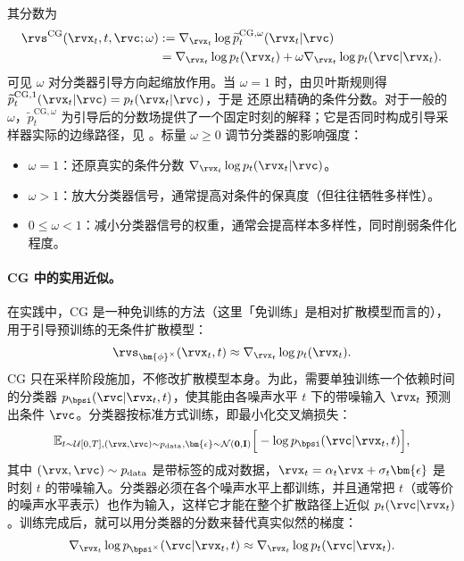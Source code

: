 其分数为
\begin{align}
\rvs^{\mathrm{CG}}(\rvx_t,t,\rvc;\omega)
&:=
\nabla_{\rvx_t}
\log\widetilde p_t^{\mathrm{CG},\omega}(\rvx_t|\rvc)
\nonumber\\
&=
\nabla_{\rvx_t}\log p_t(\rvx_t)
+
\omega\nabla_{\rvx_t}\log p_t(\rvc|\rvx_t).
\label{eq:cg_omega}
\end{align}
可见 $\omega$ 对分类器引导方向起缩放作用。当 $\omega=1$ 时，由贝叶斯规则得
$\widetilde p_t^{\mathrm{CG},1}(\rvx_t|\rvc)=p_t(\rvx_t|\rvc)$，于是
 还原出精确的条件分数。对于一般的
$\omega$，$\widetilde p_t^{\mathrm{CG},\omega}$ 为引导后的分数场提供了一个固定时刻的解释；它是否同时构成引导采样器实际的边缘路径，见
。标量 $\omega \ge 0$ 调节分类器的影响强度：
\begin{itemize}
    \item $\omega = 1$：还原真实的条件分数 $\nabla_{\rvx_t} \log p_t(\rvx_t |\rvc)$。
    \item $\omega > 1$：放大分类器信号，通常提高对条件的保真度（但往往牺牲多样性）。
    \item $0 \le \omega < 1$：减小分类器信号的权重，通常会提高样本多样性，同时削弱条件化程度。
\end{itemize}

\paragraph{CG 中的实用近似。}
在实践中，CG 是一种免训练的方法（这里「免训练」是相对扩散模型而言的），用于引导预训练的无条件扩散模型：
\[
\rvs_{\bm{\phi}^\times}(\rvx_t ,t) \approx \nabla_{\rvx_t} \log p_t(\rvx_t).
\]
CG 只在采样阶段施加，不修改扩散模型本身。为此，需要单独训练一个依赖时间的分类器 $p_{\bpsi}(\rvc |\rvx_t,t)$，使其能由各噪声水平 $t$ 下的带噪输入 $\rvx_t$ 预测出条件 $\rvc$。分类器按标准方式训练，即最小化交叉熵损失：
\begin{align}
\mathbb{E}_{t \sim \mathcal{U}[0,T], (\rvx, \rvc) \sim p_{\text{data}},  \bm{\epsilon} \sim \mathcal{N}(\mathbf{0}, \mathbf{I})}
\Big[ -\log p_{\bpsi}(\rvc | \rvx_t,t) \Big],
\end{align}
其中 $(\rvx,\rvc)\sim p_{\text{data}}$ 是带标签的成对数据，$\rvx_t = \alpha_t \rvx + \sigma_t \bm{\epsilon}$ 是时刻 $t$ 的带噪输入。分类器必须在各个噪声水平上都训练，并且通常把 $t$（或等价的噪声水平表示）也作为输入，这样它才能在整个扩散路径上近似
$p_t(\rvc|\rvx_t)$。训练完成后，就可以用分类器的分数来替代真实似然的梯度：
\[
\nabla_{\rvx_t} \log p_{\bpsi^\times}(\rvc |\rvx_t,t) \approx \nabla_{\rvx_t} \log p_t(\rvc |\rvx_t).
\]


